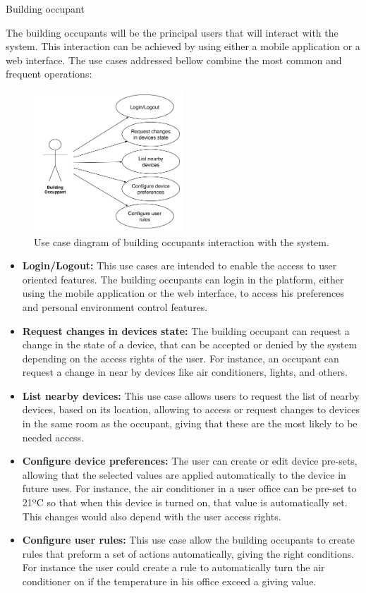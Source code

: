 \begin{Paragraph}{Building occupant}
	
The building occupants will be the principal users that will interact with the system. This interaction can be achieved by using either a mobile application or a web interface. The use cases addressed bellow combine the most common and frequent operations:


\begin{figure}[H]
	\centering
	\includegraphics[width=0.5\textwidth]{figures/usecase1.png}
	\caption{Use case diagram of building occupants interaction with the system.}
	\label{fig:user}
\end{figure}

\begin{itemize}

	\item{\textbf{Login/Logout:}	This use cases are intended to enable the access to user oriented features. The building occupants can login in the platform, either using the mobile application or the web interface, to access his preferences and personal environment control features.}
	\item{\textbf{Request changes in devices state:}	The building occupant can request a change in the state of a device, that can be accepted or denied by the system depending on the access rights of the user. For instance, an occupant can request a change in near by devices like  air conditioners, lights, and others.}
	\item{\textbf{List nearby devices:}	This use case allows users to request the list of nearby devices, based on its location, allowing to access or request changes to devices in the same room as the occupant, giving that these are the most likely to be needed access.}
	\item{\textbf{Configure device preferences:}	The user can create or edit device pre-sets, allowing that the selected values are applied automatically to the device in future uses. For instance, the air conditioner in a user office can be pre-set to 21ºC so that when this device is turned on, that value is automatically set. This changes would also depend with the user access rights.}
	\item{\textbf{Configure user rules:}	This use case allow the building occupants to create rules that preform a set of actions automatically, giving the right conditions. For instance the user could create a rule to automatically turn the air conditioner on if the temperature in his office exceed a giving value.} 


\end{itemize}
\end{Paragraph}
